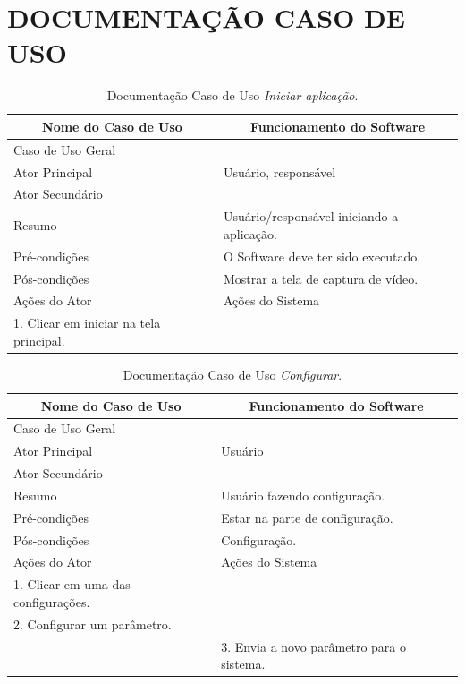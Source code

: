 \chapter{DOCUMENTAÇÃO CASO DE USO}
\label{Apx:A}
\begin{longtable}{|l|l|}
\caption{Documentação Caso de Uso \textit{Iniciar aplicação}.} \label{tab:dcu-1} \\
\hline 
\multicolumn{1}{|c|}{\textbf{Nome do Caso de Uso}} & 
\multicolumn{1}{c|}{\textbf{Funcionamento do Software}} \\ \hline 
\endfirsthead
\hline
Caso de Uso Geral &  \\ \hline
Ator Principal & Usuário, responsável\\ \hline
Ator Secundário &  \\ \hline
Resumo & Usuário/responsável iniciando a aplicação. \\ \hline 
Pré-condições &  O Software deve ter sido executado. \\ \hline 
Pós-condições &  Mostrar a tela de captura de vídeo. \\ \hline
 Ações do Ator& Ações do Sistema \\ \hline
 1.	Clicar em iniciar na tela principal.&  \\ \hline
\end{longtable}

\begin{longtable}{|l|l|}
\caption{Documentação Caso de Uso \textit{Configurar}.} \label{tab:dcu-1} \\
\hline 
\multicolumn{1}{|c|}{\textbf{Nome do Caso de Uso}} & 
\multicolumn{1}{c|}{\textbf{Funcionamento do Software}} \\ \hline 
\endfirsthead
\hline
Caso de Uso Geral &  \\ \hline
Ator Principal & Usuário\\ \hline
Ator Secundário & \\ \hline
Resumo & Usuário fazendo configuração. \\ \hline 
Pré-condições &  Estar na parte de configuração. \\ \hline 
Pós-condições &  Configuração. \\ \hline
 Ações do Ator& Ações do Sistema \\ \hline
 1.	Clicar em uma das configurações.&  \\ \hline
 2.	Configurar um parâmetro.&  \\ \hline
 & 3. Envia a novo parâmetro para o sistema. \\ \hline
\end{longtable}

